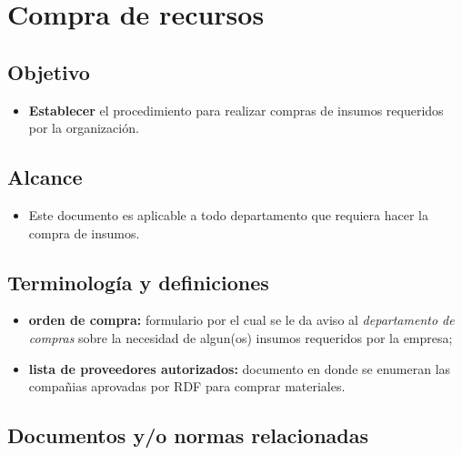 \renewcommand{\Codigo}{BPD-PROG}
\renewcommand{\FechaPub}{2023-01}
\renewcommand{\Edit}{03}
\renewcommand{\Titulo}{Compra de recursos}
\section{\Titulo}


\subsection{Objetivo}

\begin{itemize}
	\item \textbf{Establecer} el procedimiento para realizar compras de insumos requeridos por la organización.
\end{itemize}

\subsection{Alcance}

\begin{itemize}
	\item Este documento es aplicable a todo departamento que requiera hacer la compra de insumos.
\end{itemize}

\subsection{Terminología y definiciones}

\begin{itemize}
	\item \textbf{orden de compra:} formulario por el cual se le da aviso al \emph{departamento de compras} sobre la necesidad de algun(os) insumos requeridos por la empresa;
	\item \textbf{lista de proveedores autorizados:} documento en donde se enumeran las compañias aprovadas por RDF para comprar materiales.
\end{itemize}

\subsection{Documentos y/o normas relacionadas}

